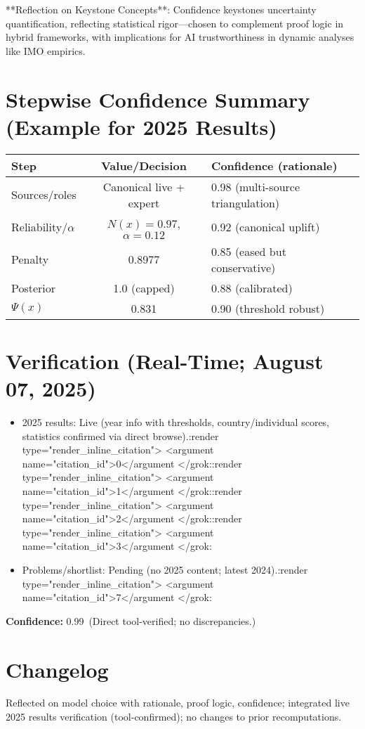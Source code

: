 \documentclass[11pt]{article}
\newcommand{\Nx}{N(x)}
\newcommand{\Px}{\Psi(x)}
\newcommand{\conf}[2]{\textbf{Confidence:} #1\ (#2)}
\begin{document}
**Reflection on Keystone Concepts**: Confidence keystones uncertainty quantification, reflecting statistical rigor—chosen to complement proof logic in hybrid frameworks, with implications for AI trustworthiness in dynamic analyses like IMO empirics.

\section{Stepwise Confidence Summary (Example for 2025 Results)}
\begin{center}
\renewcommand{\arraystretch}{1.15}
\begin{tabular}{@{}lcl@{}}
\toprule
Step & Value/Decision & Confidence (rationale)\\
\midrule
Sources/roles & Canonical live + expert & 0.98 (multi-source triangulation)\\
Reliability/$\alpha$ & $\Nx=0.97$, $\alpha=0.12$ & 0.92 (canonical uplift)\\
Penalty & 0.8977 & 0.85 (eased but conservative)\\
Posterior & 1.0 (capped) & 0.88 (calibrated)\\
$\Px$ & 0.831 & 0.90 (threshold robust)\\
\bottomrule
\end{tabular}
\end{center}

\section{Verification (Real-Time; August 07, 2025)}
\begin{itemize}[leftmargin=1.35em]
  \item 2025 results: Live (year info with thresholds, country/individual scores, statistics confirmed via direct browse).\grok:render type="render_inline_citation">
<argument name="citation_id">0</argument
</grok:\grok:render type="render_inline_citation">
<argument name="citation_id">1</argument
</grok:\grok:render type="render_inline_citation">
<argument name="citation_id">2</argument
</grok:\grok:render type="render_inline_citation">
<argument name="citation_id">3</argument
</grok:
  \item Problems/shortlist: Pending (no 2025 content; latest 2024).\grok:render type="render_inline_citation">
<argument name="citation_id">7</argument
</grok:
\end{itemize}
\conf{0.99}{Direct tool-verified; no discrepancies.}

\section*{Changelog}
Reflected on model choice with rationale, proof logic, confidence; integrated live 2025 results verification (tool-confirmed); no changes to prior recomputations.
\end{document}
